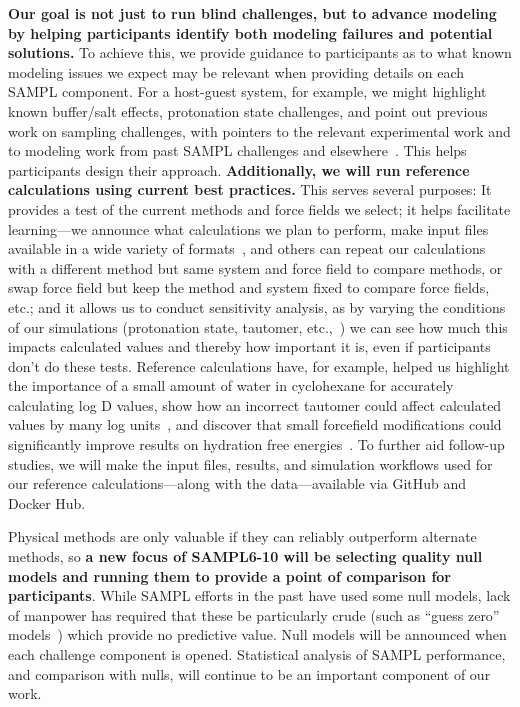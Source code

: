 \documentclass[11pt]{article}
\begin{document}
\textbf{Our goal is not just to run blind challenges, but to advance modeling by helping participants identify both modeling failures and potential solutions.} 
To achieve this, we provide guidance to participants as to what known modeling issues we expect may be relevant when providing details on each SAMPL component.
For a host-guest system, for example, we might highlight known buffer/salt effects, protonation state challenges, and point out previous work on sampling challenges, with pointers to the relevant experimental work and to modeling work from past SAMPL challenges and elsewhere~\cite{mobley_predicting_2016}.
This helps participants design their approach.
{\bf Additionally, we will run reference calculations using current best practices.} 
This serves several purposes:
It provides a test of the current methods and force fields we select; 
it helps facilitate learning---we announce what calculations we plan to perform, make input files available in a wide variety of formats~\cite{shirts_lessons_2016, yin_overview_2016, bannan_blind_2016}, and others can repeat our calculations with a different method but same system and force field to compare methods, or swap force field but keep the method and system fixed to compare force fields, etc.; 
and it allows us to conduct sensitivity analysis, as by varying the conditions of our simulations (protonation state, tautomer, etc.,~\cite{bannan_blind_2016}) we can see how much this impacts calculated values and thereby how important it is, even if participants don't do these tests.
Reference calculations have, for example, helped us highlight the importance of a small amount of water in cyclohexane for accurately calculating log D values, show how an incorrect tautomer could affect calculated values by many log units~\cite{bannan_blind_2016}, and discover that small forcefield modifications could significantly improve results on hydration free energies~\cite{mobley_blind_2014-1}.
To further aid follow-up studies, we will make the input files, results, and simulation workflows used for our reference calculations---along with the data---available via GitHub and Docker Hub.


Physical methods are only valuable if they can reliably outperform alternate methods, so \textbf{a new focus of SAMPL6-10 will be selecting quality null models and running them to provide a point of comparison for participants}.
While SAMPL efforts in the past have used some null models, lack of manpower has required that these be particularly crude (such as ``guess zero'' models~\cite{bannan_blind_2016, paranahewage_predicting_2016, muddana_sampl4_2014}) which provide no predictive value. 
Null models will be announced when each challenge component is opened.
Statistical analysis of SAMPL performance, and comparison with nulls, will continue to be an important component of our work.
\end{document}
